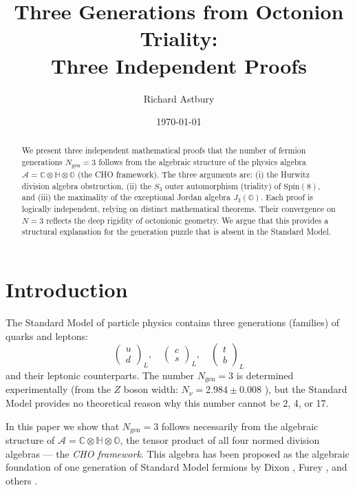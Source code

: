 \documentclass[12pt,a4paper]{article}
\title{Three Generations from Octonion Triality:\\Three Independent Proofs}
\author{Richard Astbury}
\date{\today}
\theoremstyle{definition}
\theoremstyle{remark}
\newcommand{\Oct}{\mathbb{O}}
\newcommand{\Quat}{\mathbb{H}}
\newcommand{\Comp}{\mathbb{C}}
\newcommand{\Alg}{\mathcal{A}}
\newcommand{\Spin}{\mathrm{Spin}}
\begin{document}
\maketitle

\begin{abstract}
We present three independent mathematical proofs that the number of fermion 
generations $N_{\mathrm{gen}} = 3$ follows from the algebraic structure of 
the physics algebra $\Alg = \Comp \otimes \Quat \otimes \Oct$ 
(the CHO framework). 
The three arguments are:
(i) the Hurwitz division algebra obstruction,
(ii) the $S_3$ outer automorphism (triality) of $\Spin(8)$, and
(iii) the maximality of the exceptional Jordan algebra $J_3(\Oct)$.
Each proof is logically independent, relying on distinct mathematical theorems.
Their convergence on $N = 3$ reflects the deep rigidity of octonionic geometry.
We argue that this provides a structural explanation for the generation puzzle
that is absent in the Standard Model.
\end{abstract}

\tableofcontents

\section{Introduction}

The Standard Model of particle physics contains three generations (families) 
of quarks and leptons:
\begin{equation}
\begin{pmatrix} u \\ d \end{pmatrix}_L, \quad
\begin{pmatrix} c \\ s \end{pmatrix}_L, \quad
\begin{pmatrix} t \\ b \end{pmatrix}_L
\end{equation}
and their leptonic counterparts. The number $N_{\mathrm{gen}} = 3$ is determined 
experimentally (from the $Z$ boson width: $N_\nu = 2.984 \pm 0.008$ 
\cite{PDG2024}), but the Standard Model provides no theoretical reason why this 
number cannot be 2, 4, or 17.

In this paper we show that $N_{\mathrm{gen}} = 3$ follows necessarily from the 
algebraic structure of $\Alg = \Comp \otimes \Quat \otimes \Oct$, the tensor 
product of all four normed division algebras --- the \emph{CHO framework}. 
This algebra has been proposed as the algebraic foundation of one generation 
of Standard Model fermions by Dixon \cite{Dixon1994}, Furey 
\cite{Furey2016,Furey2018}, and others \cite{Boyle2020,Todorov2019,Dray2015}.
\end{document}
